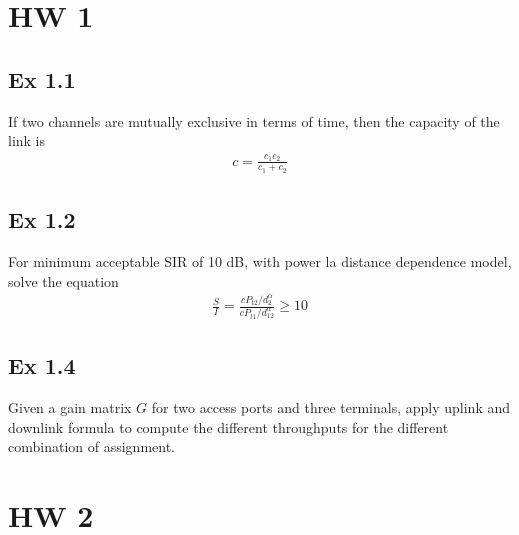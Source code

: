 
\section*{HW 1}

\subsection*{Ex 1.1}
If two channels are mutually exclusive in terms of time, then the capacity of the link is 
\begin{align*}
	c = \frac{c_1 c_2}{c_1 + c_2}
\end{align*}

\subsection*{Ex 1.2}
For minimum acceptable SIR of 10 dB, with power la distance dependence model, solve the equation 
\begin{align*}
	\frac{S}{I} = \frac{c P_{t2} / d_2^{\alpha}}{c P_{t1} / d_{12}^{\alpha}} \geq 10
\end{align*}

\subsection*{Ex 1.4}
Given a gain matrix $G$ for two access ports and three terminals, apply uplink and downlink formula to compute the different throughputs for the different combination of assignment.


\section*{HW 2}

